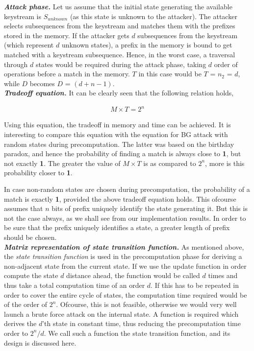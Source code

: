 \indent \textit{\textbf{Attack phase.}} Let us assume that the initial state generating the available keystream is $S_{unknown}$ (as this state is unknown to the attacker). The attacker selects subsequences from the keystream and matches them with the prefixes stored in the memory. If the attacker gets $d$ subsequences from the keystream (which represent $d$ unknown states), a prefix in the memory is bound to get matched with a keystream subsequence. Hence, in the worst case, a traversal through $d$ states would be required during the attack phase, taking $d$ order of operations before a match in the memory. $T$ in this case would be $T$ = $n_2$ = $d$, while $D$ becomes $D$ = $(d + n - 1)$.\\

\indent \textit{\textbf{Tradeoff equation.}} It can be clearly seen that the following relation holds,

\begin{align}
\label{eq:tmto-non-random} M \times T = 2^n
\end{align}

Using this equation, the tradeoff in memory and time can be achieved. It is interesting to compare this equation with the equation for BG attack with random states during precomputation. The latter was based on the birthday paradox, and hence the probability of finding a match is always close to \textbf{1}, but not exactly \textbf{1}. The greater the value of $M \times T$ is as compared to $2^n$, more is this probability closer to \textbf{1}.

In case non-random states are chosen during precomputation, the probability of a match is exactly \textbf{1}, provided the above tradeoff equation holds. This ofcourse assumes that $n$ bits of prefix uniquely identify the state generating it. But this is not the case always, as we shall see from our implementation results. In order to be sure that the prefix uniquely identifies a state, a greater length of prefix should be chosen.\\

\indent \textit{\textbf{Matrix representation of state transition function.}} As mentioned above, the \emph{state transition function} is used in the precomputation phase for deriving a non-adjacent state from the current state. If we use the update function in order compute the state $d$ distance ahead, the function would be called $d$ times and thus take a total computation time of an order $d$. If this has to be repeated in order to cover the entire cycle of states, the computation time required would be of the order of $2^n$. Ofcourse, this is not feasible, otherwise we would very well launch a brute force attack on the internal state. A function is required which derives the $d$'th state in constant time, thus reducing the precomputation time order to $2^{n}/d$. We call such a function the state transition function, and its design is discussed here. 

